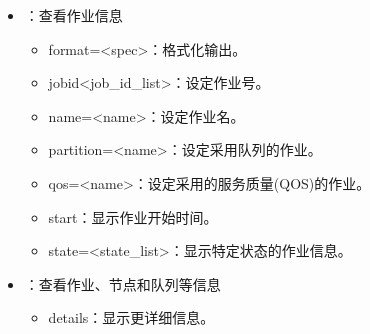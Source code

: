 \documentclass[a4paper,12pt,english]{sphinxmanual}
\begin{document}
\begin{itemize}
\begin{itemize}
\begin{itemize}
\item {} 
\sphinxAtStartPar
\sphinxhyphen{}\sphinxhyphen{}name=<name>：设定作业名。

\item {} 
\sphinxAtStartPar
\sphinxhyphen{}\sphinxhyphen{}partition=<name>：设定采用队列的作业。

\item {} 
\sphinxAtStartPar
\sphinxhyphen{}\sphinxhyphen{}qos=<name>：设定采用的服务质量(QOS)的作业。

\item {} 
\sphinxAtStartPar
\sphinxhyphen{}\sphinxhyphen{}reservation=<name>：设定采用了预留测略的作业。

\item {} 
\sphinxAtStartPar
\sphinxhyphen{}\sphinxhyphen{}nodelist=<name>：设定采用特定节点名的作业，格式类似node{[}1\sphinxhyphen{}10,11,13\sphinxhyphen{}28{]}。

\end{itemize}

\item {} 
\sphinxAtStartPar
{}：查看作业信息
\begin{itemize}
\item {} 
\sphinxAtStartPar
\sphinxhyphen{}\sphinxhyphen{}format=<spec>：格式化输出。

\item {} 
\sphinxAtStartPar
\sphinxhyphen{}\sphinxhyphen{}jobid<job\_id\_list>：设定作业号。

\item {} 
\sphinxAtStartPar
\sphinxhyphen{}\sphinxhyphen{}name=<name>：设定作业名。

\item {} 
\sphinxAtStartPar
\sphinxhyphen{}\sphinxhyphen{}partition=<name>：设定采用队列的作业。

\item {} 
\sphinxAtStartPar
\sphinxhyphen{}\sphinxhyphen{}qos=<name>：设定采用的服务质量(QOS)的作业。

\item {} 
\sphinxAtStartPar
\sphinxhyphen{}\sphinxhyphen{}start：显示作业开始时间。

\item {} 
\sphinxAtStartPar
\sphinxhyphen{}\sphinxhyphen{}state=<state\_list>：显示特定状态的作业信息。

\end{itemize}

\item {} 
\sphinxAtStartPar
{}：查看作业、节点和队列等信息
\begin{itemize}
\item {} 
\sphinxAtStartPar
\sphinxhyphen{}\sphinxhyphen{}details：显示更详细信息。


\end{itemize}
\end{itemize}
\end{itemize}
\end{document}

